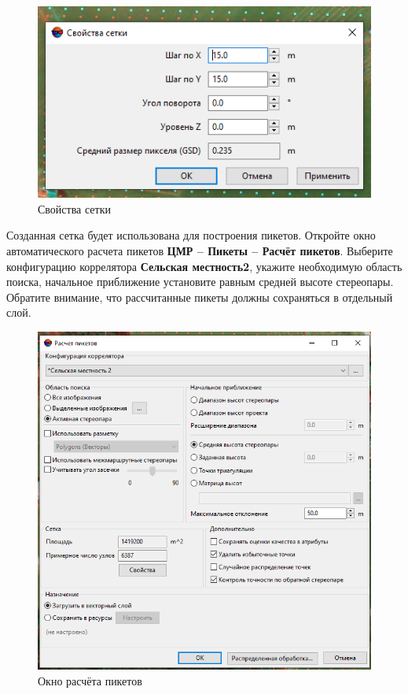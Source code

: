\documentclass[
  12pt,
]{book}
\begin{document}
\begin{figure}
\centering
\includegraphics{images/Ref16/Grid_Properties.png}
\caption{Свойства сетки}
\end{figure}

Созданная сетка будет использована для построения пикетов. Откройте окно автоматического расчета пикетов \textbf{ЦМР -- Пикеты -- Расчёт пикетов}. Выберите конфигурацию коррелятора \textbf{Сельская местность2}, укажите необходимую область поиска, начальное приближение установите равным средней высоте стереопары. Обратите внимание, что рассчитанные пикеты должны сохраняться в отдельный слой.

\begin{figure}
\centering
\includegraphics{images/Ref16/Piket_Calculation.png}
\caption{Окно расчёта пикетов}
\end{figure}
\end{document}
